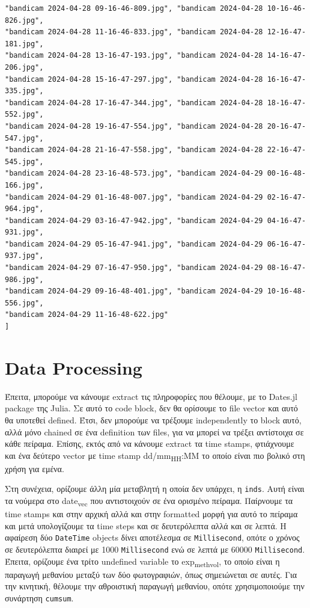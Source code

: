 \documentclass[11pt]{article}
\begin{document}
\begin{verbatim}
"bandicam 2024-04-28 09-16-46-809.jpg", "bandicam 2024-04-28 10-16-46-826.jpg",
"bandicam 2024-04-28 11-16-46-833.jpg", "bandicam 2024-04-28 12-16-47-181.jpg",
"bandicam 2024-04-28 13-16-47-193.jpg", "bandicam 2024-04-28 14-16-47-206.jpg",
"bandicam 2024-04-28 15-16-47-297.jpg", "bandicam 2024-04-28 16-16-47-335.jpg",
"bandicam 2024-04-28 17-16-47-344.jpg", "bandicam 2024-04-28 18-16-47-552.jpg",
"bandicam 2024-04-28 19-16-47-554.jpg", "bandicam 2024-04-28 20-16-47-547.jpg",
"bandicam 2024-04-28 21-16-47-558.jpg", "bandicam 2024-04-28 22-16-47-545.jpg",
"bandicam 2024-04-28 23-16-48-573.jpg", "bandicam 2024-04-29 00-16-48-166.jpg",
"bandicam 2024-04-29 01-16-48-007.jpg", "bandicam 2024-04-29 02-16-47-964.jpg",
"bandicam 2024-04-29 03-16-47-942.jpg", "bandicam 2024-04-29 04-16-47-931.jpg",
"bandicam 2024-04-29 05-16-47-941.jpg", "bandicam 2024-04-29 06-16-47-937.jpg",
"bandicam 2024-04-29 07-16-47-950.jpg", "bandicam 2024-04-29 08-16-47-986.jpg",
"bandicam 2024-04-29 09-16-48-401.jpg", "bandicam 2024-04-29 10-16-48-556.jpg",
"bandicam 2024-04-29 11-16-48-622.jpg"
]
\end{verbatim}

\section{Data Processing}
\label{sec:org152b94e}
Έπειτα, μπορούμε να κάνουμε extract τις πληροφορίες που θέλουμε, με το Dates.jl package της Julia. Σε αυτό το code block, δεν θα ορίσουμε το file vector και αυτό θα υποτεθεί defined. Έτσι, δεν μπορούμε να τρέξουμε independently το block αυτό, αλλά μόνο chained σε ένα definition των files, για να μπορεί να τρέξει αντίστοιχα σε κάθε πείραμα. Επίσης, εκτός από να κάνουμε extract τα time stamps, φτιάχνουμε και ένα δεύτερο vector με time stamp dd/mm\textsubscript{HH}:MM το οποίο είναι πιο βολικό στη χρήση για εμένα.

Στη συνέχεια, ορίζουμε άλλη μία μεταβλητή η οποία δεν υπάρχει, η \texttt{inds}. Αυτή είναι τα νούμερα στο date\textsubscript{vec} που αντιστοιχούν σε ένα ορισμένο πείραμα. Παίρνουμε τα time stamps και στην αρχική αλλά και στην formatted μορφή για αυτό το πείραμα και μετά υπολογίζουμε τα time steps και σε δευτερόλεπτα αλλά και σε λεπτά. Η αφαίρεση δύο \texttt{DateTime} objects δίνει αποτέλεσμα σε \texttt{Millisecond}, οπότε ο χρόνος σε δευτερόλεπτα διαιρεί με 1000 \texttt{Millisecond} ενώ σε λεπτά με 60000 \texttt{Millisecond}. Έπειτα, ορίζουμε ένα τρίτο undefined variable το exp\textsubscript{meth}\textsubscript{vol}, το οποίο είναι η παραγωγή μεθανίου μεταξύ των δύο φωτογραφιών, όπως σημειώνεται σε αυτές. Για την κινητική, θέλουμε την αθροιστική παραγωγή μεθανίου, οπότε χρησιμοποιούμε την συνάρτηση \texttt{cumsum}.
\end{document}
